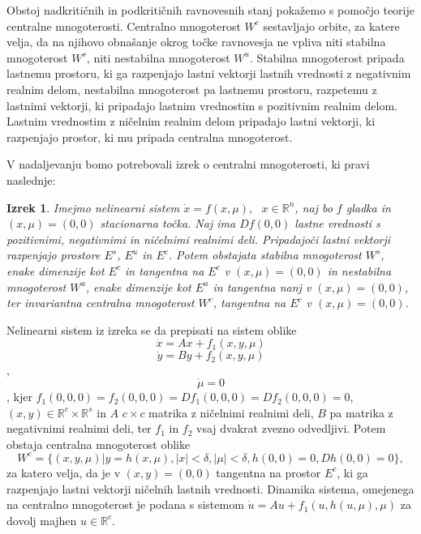 \documentclass[a4paper,12pt]{article}
\newtheorem{izrek}{Izrek}
\begin{document}
Obstoj nadkritičnih in podkritičnih ravnovesnih stanj pokažemo s pomočjo teorije 
centralne mnogoterosti. Centralno mnogoterost \(W^c\) sestavljajo orbite, za katere velja, da na 
njihovo obnašanje okrog točke ravnovesja ne vpliva niti stabilna mnogoterost \(W^s\), niti nestabilna 
mnogoterost \(W^u\). Stabilna mnogoterost pripada lastnemu prostoru, ki ga razpenjajo lastni vektorji 
lastnih vrednosti z negativnim realnim delom, nestabilna mnogoterost pa lastnemu prostoru, razpetemu z 
lastnimi vektorji, ki pripadajo lastnim vrednostim s pozitivnim realnim delom. Lastnim vrednostim z ničelnim 
realnim delom pripadajo lastni vektorji, ki razpenjajo prostor, ki mu pripada centralna mnogoterost. 

V nadaljevanju bomo potrebovali izrek o centralni mnogoterosti, ki pravi naslednje:

\begin{izrek}\label{izrekcm}
    Imejmo nelinearni sistem \(\dot{x}=f(x,\mu),\textrm{ }x\in\mathbb{R}^n\), naj bo \(f\) gladka 
    in \((x,\mu)=(0,0)\) stacionarna točka. Naj ima \(Df(0,0)\) lastne vrednosti s pozitivnimi, negativnimi in 
    ničelnimi realnimi deli. Pripadajoči lastni vektorji razpenjajo prostore \(E^s\), \(E^u\) in \(E^c\). 
    Potem obstajata stabilna mnogoterost \(W^s\), enake dimenzije kot \(E^c\) in tangentna na \(E^c\) v \((x,\mu)=(0,0)\) in nestabilna mnogoterost \(W^u\),
    enake dimenzije kot \(E^u\) in tangentna nanj v \((x,\mu)=(0,0)\), ter invariantna centralna mnogoterost \(W^c\), 
    tangentna na \(E^c\) v \((x,\mu)=(0,0)\).
\end{izrek}

Nelinearni sistem iz izreka se da prepisati na sistem oblike 
\[\dot{x}=Ax+f_1(x,y,\mu)\]
\[\dot{y}=By+f_2(x,y,\mu)\],
\[\dot{\mu}=0\],
kjer \(f_1(0,0,0)=f_2(0,0,0)=Df_1(0,0,0)=Df_2(0,0,0)=0\), \((x,y)\in \mathbb{R}^c\times \mathbb{R}^s\) 
in \(A\) \(c \times c\) matrika z ničelnimi realnimi deli, \(B\) pa matrika z negativnimi realnimi deli, 
ter \(f_1\) in \(f_2\) vsaj dvakrat zvezno odvedljivi. Potem obstaja 
centralna mnogoterost oblike
\[W^c=\{(x,y,\mu)|y=h(x,\mu), |x|<\delta, |\mu|<\delta, h(0,0)=0, Dh(0,0)=0\},\]
za katero velja, da je v \((x,y)=(0,0)\) tangentna na prostor \(E^c\), ki ga razpenjajo lastni vektorji ničelnih lastnih vrednosti. 
Dinamika sistema, omejenega na centralno mnogoterost je podana s sistemom 
\(\dot{u}=Au+f_1(u,h(u,\mu),\mu)\) za dovolj majhen \(u\in \mathbb{R}^c\).
\end{document}
